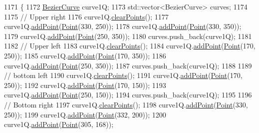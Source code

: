 \begin{DoxyCode}
1171                \{
1172     \mbox{\hyperlink{class_bezier_curve}{BezierCurve}} curve1Q;
1173     std::vector<BezierCurve> curves;
1174 
1175     \textcolor{comment}{// Upper right}
1176     curve1Q.\mbox{\hyperlink{class_bezier_curve_a0ba8ce66d5af5971ae6a1b506029728e}{clearPoints}}();
1177     curve1Q.\mbox{\hyperlink{class_bezier_curve_a38d16c18b36ae45619b05e26e226cf34}{addPoint}}(\mbox{\hyperlink{class_point}{Point}}(330, 250));
1178     curve1Q.\mbox{\hyperlink{class_bezier_curve_a38d16c18b36ae45619b05e26e226cf34}{addPoint}}(\mbox{\hyperlink{class_point}{Point}}(330, 350));
1179     curve1Q.\mbox{\hyperlink{class_bezier_curve_a38d16c18b36ae45619b05e26e226cf34}{addPoint}}(\mbox{\hyperlink{class_point}{Point}}(250, 350));
1180     curves.push\_back(curve1Q);
1181 
1182     \textcolor{comment}{// Upper left}
1183     curve1Q.\mbox{\hyperlink{class_bezier_curve_a0ba8ce66d5af5971ae6a1b506029728e}{clearPoints}}();
1184     curve1Q.\mbox{\hyperlink{class_bezier_curve_a38d16c18b36ae45619b05e26e226cf34}{addPoint}}(\mbox{\hyperlink{class_point}{Point}}(170, 250));
1185     curve1Q.\mbox{\hyperlink{class_bezier_curve_a38d16c18b36ae45619b05e26e226cf34}{addPoint}}(\mbox{\hyperlink{class_point}{Point}}(170, 350));
1186     curve1Q.\mbox{\hyperlink{class_bezier_curve_a38d16c18b36ae45619b05e26e226cf34}{addPoint}}(\mbox{\hyperlink{class_point}{Point}}(250, 350));
1187     curves.push\_back(curve1Q);
1188 
1189     \textcolor{comment}{// bottom left}
1190     curve1Q.\mbox{\hyperlink{class_bezier_curve_a0ba8ce66d5af5971ae6a1b506029728e}{clearPoints}}();
1191     curve1Q.\mbox{\hyperlink{class_bezier_curve_a38d16c18b36ae45619b05e26e226cf34}{addPoint}}(\mbox{\hyperlink{class_point}{Point}}(170, 250));
1192     curve1Q.\mbox{\hyperlink{class_bezier_curve_a38d16c18b36ae45619b05e26e226cf34}{addPoint}}(\mbox{\hyperlink{class_point}{Point}}(170, 150));
1193     curve1Q.\mbox{\hyperlink{class_bezier_curve_a38d16c18b36ae45619b05e26e226cf34}{addPoint}}(\mbox{\hyperlink{class_point}{Point}}(250, 150));
1194     curves.push\_back(curve1Q);
1195 
1196     \textcolor{comment}{// Bottom right}
1197     curve1Q.\mbox{\hyperlink{class_bezier_curve_a0ba8ce66d5af5971ae6a1b506029728e}{clearPoints}}();
1198     curve1Q.\mbox{\hyperlink{class_bezier_curve_a38d16c18b36ae45619b05e26e226cf34}{addPoint}}(\mbox{\hyperlink{class_point}{Point}}(330, 250));
1199     curve1Q.\mbox{\hyperlink{class_bezier_curve_a38d16c18b36ae45619b05e26e226cf34}{addPoint}}(\mbox{\hyperlink{class_point}{Point}}(332, 200));
1200     curve1Q.\mbox{\hyperlink{class_bezier_curve_a38d16c18b36ae45619b05e26e226cf34}{addPoint}}(\mbox{\hyperlink{class_point}{Point}}(305, 168));

\end{DoxyCode}
